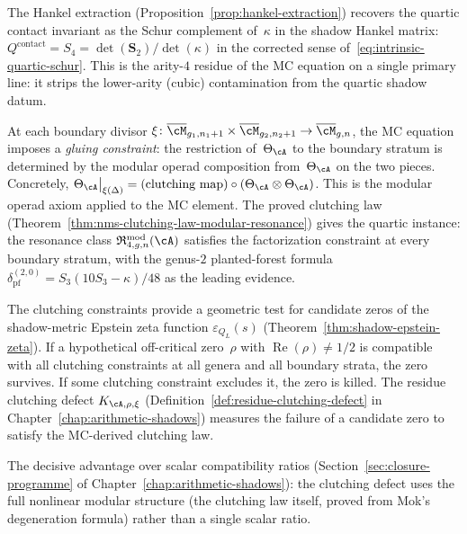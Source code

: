 \begin{remark}%
\label{rem:schur-complement-clutching}%
%
The Hankel extraction
(Proposition~\ref{prop:hankel-extraction})
recovers the quartic contact invariant as the Schur
complement of~$\kappa$ in the shadow Hankel matrix:
$Q^{\mathrm{contact}} = S_4 = \det(\mathbf{S}_2)/\det(\kappa)$
in the corrected sense of~\eqref{eq:intrinsic-quartic-schur}.
This is the arity-$4$ residue of the MC equation on a
single primary line: it strips the lower-arity (cubic)
contamination from the quartic shadow datum.
\end{remark}

\begin{remark}%
\label{rem:clutching-law-programme}%
%
At each boundary divisor $\xi\colon
\overline{\cM}_{g_1,n_1+1} \times
\overline{\cM}_{g_2,n_2+1} \to
\overline{\cM}_{g,n}$, the MC equation imposes a
\emph{gluing constraint}: the restriction of~$\Theta_\cA$
to the boundary stratum is determined by the modular operad
composition from~$\Theta_\cA$ on the two pieces.
Concretely,
$\Theta_\cA\big|_{\xi(\Delta)}
= (\text{clutching map}) \circ
(\Theta_\cA \otimes \Theta_\cA)$.
This is the modular operad axiom applied to the MC element.
The proved clutching law
(Theorem~\ref{thm:nms-clutching-law-modular-resonance})
gives the quartic instance: the resonance class
$\mathfrak{R}_{4,g,n}^{\mathrm{mod}}(\cA)$
satisfies the factorization constraint at every boundary
stratum, with the genus-$2$ planted-forest formula
$\delta_{\mathrm{pf}}^{(2,0)}
= S_3(10S_3 - \kappa)/48$
as the leading evidence.
\end{remark}

\begin{remark}%
\label{rem:geometric-zero-test}%
%
%
The clutching constraints provide a geometric test for
candidate zeros of the shadow-metric Epstein zeta function
$\varepsilon_{Q_L}(s)$
(Theorem~\ref{thm:shadow-epstein-zeta}).
If a hypothetical off-critical zero~$\rho$ with
$\operatorname{Re}(\rho) \neq 1/2$ is compatible with all
clutching constraints at all genera and all boundary strata,
the zero survives.  If some clutching constraint excludes it,
the zero is killed.  The residue clutching defect
$K_{\cA,\rho,\xi}$
(Definition~\ref{def:residue-clutching-defect}
in Chapter~\ref{chap:arithmetic-shadows})
measures the failure of a candidate zero to satisfy the
MC-derived clutching law.

The decisive advantage over scalar compatibility ratios
(Section~\ref{sec:closure-programme}
of Chapter~\ref{chap:arithmetic-shadows}):
the clutching defect uses the full nonlinear modular
structure (the clutching law itself, proved from Mok's
degeneration formula) rather than a single scalar ratio.
\end{remark}

